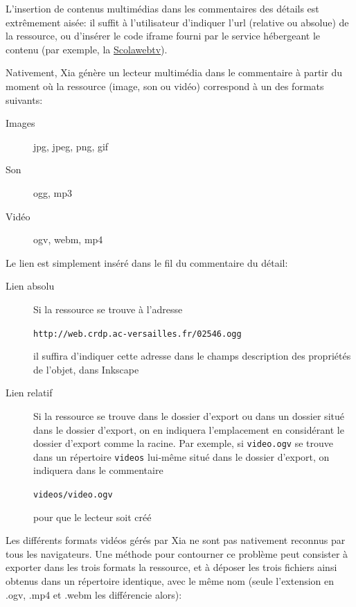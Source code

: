 {L'insertion de contenus multimédias dans les commentaires des détails est extrêmement aisée:
il suffit à l'utilisateur d'indiquer l'url (relative ou absolue) de la ressource, ou d'insérer le code iframe
fourni par le service hébergeant le contenu (par exemple, la \href{https://scolawebtv.crdp-versailles.fr/}{Scolawebtv}).

Nativement, Xia génère un lecteur multimédia dans le commentaire à partir du moment où la ressource (image, son ou vidéo)
correspond à un des formats suivants:
\begin{description}
 \item [Images] jpg, jpeg, png, gif
 \item [Son] ogg, mp3
 \item [Vidéo] ogv, webm, mp4
\end{description}

Le lien est simplement inséré dans le fil du commentaire du détail:
\begin{description}
 \item [Lien absolu] Si la ressource se trouve à l'adresse\\
 \begin{center}
 \verb|http://web.crdp.ac-versailles.fr/02546.ogg|\\
 \end{center}
 il suffira d'indiquer cette adresse dans le champs description des propriétés de l'objet, dans Inkscape
 \item [Lien relatif] Si la ressource se trouve dans le dossier d'export ou dans un dossier situé dans le dossier d'export, on en indiquera
 l'emplacement en considérant le dossier d'export comme la racine. Par exemple, si \verb|video.ogv| se trouve dans un répertoire \verb|videos| lui-même situé dans le dossier d'export, on indiquera dans
 le commentaire\\
 \begin{center}
  \verb|videos/video.ogv|
 \end{center}
  pour que le lecteur soit créé
\end{description}

Les différents formats vidéos gérés par Xia ne sont pas nativement reconnus par tous les navigateurs.
Une méthode pour contourner ce problème peut consister à exporter dans les trois formats la ressource,
et à déposer les trois fichiers ainsi obtenus dans un répertoire identique, avec le même nom (seule l'extension
en .ogv, .mp4 et .webm les différencie alors):\\

}
